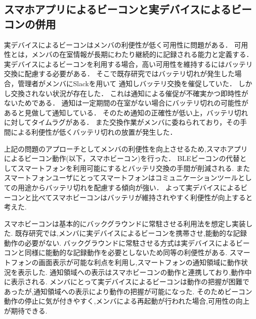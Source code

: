 \subsection{スマホアプリによるビーコンと実デバイスによるビーコンの併用}








実デバイスによるビーコンはメンバの利便性が低く可用性に問題がある．
可用性とは，メンバの在室情報が長期にわたり継続的に記録される能力と定義する．
実デバイスによるビーコンを利用する場合，高い可用性を維持するにはバッテリ交換に配慮する必要がある．
そこで既存研究ではバッテリ切れが発生した場合，管理者がメンバにSlackを用いて
通知しバッテリ交換を催促していた．
しかし交換されない状況が存在した．
これは通知による催促が不確実かつ即時性がないためである．
通知は一定期間の在室がない場合にバッテリ切れの可能性があると見做して通知している．
そのため通知の正確性が低い上，バッテリ切れに対してタイムラグがある．
また交換作業がメンバに委ねられており，その手間による利便性が低くバッテリ切れの放置が発生した．


上記の問題のアプローチとしてメンバの利便性を向上させるため,スマホアプリによるビーコン動作(以下，スマホビーコン)を行った．
BLEビーコンの代替としてスマートフォンを利用可能にするとバッテリ交換の手間が削減される.
またスマートフォンユーザにとってスマートフォンはコミュニケーションツールとしての用途からバッテリ切れを配慮する傾向が強い．
よって実デバイスによるビーコンと比べてスマホビーコンはバッテリが維持されやすく利便性が向上すると考えた.

スマホビーコンは基本的にバックグラウンドに常駐させる利用法を想定し実装した.
既存研究では,メンバに実デバイスによるビーコンを携帯させ,能動的な記録動作の必要がない.
バックグラウンドに常駐させる方式は実デバイスによるビーコンと同様に能動的な記録動作を必要としないため同等の利便性がある.
スマートフォンの画面表示が可能な利点を利用し,スマートフォンの通知領域に動作状況を表示した.
通知領域への表示はスマホビーコンの動作と連携しており,動作中に表示される.
メンバにとって実デバイスによるビーコンは動作の把握が困難であったが,通知領域への表示により動作の把握が可能になった.
そのためビーコン動作の停止に気が付きやすく,メンバによる再起動が行われた場合,可用性の向上が期待できる.





